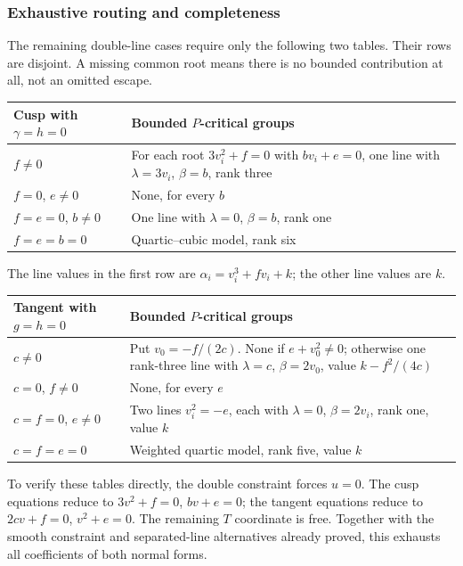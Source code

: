 \documentclass[11pt]{article}
\theoremstyle{definition}\newtheorem{definition}[theorem]{Definition}
\theoremstyle{remark}\newtheorem{remark}[theorem]{Remark}
\begin{document}
\subsubsection*{Exhaustive routing and completeness}

The remaining double-line cases require only the following two
tables. Their rows are disjoint. A missing common root means
there is no bounded contribution at all, not an omitted escape.

\begin{center}\small
\begin{tabular}{@{}p{}p{}@{}}
\toprule
Cusp with $\gamma=h=0$ & Bounded $P$-critical groups\\
\midrule
$f\ne0$ & For each root $3v_i^2+f=0$ with $bv_i+e=0$,
one line with $\lambda=3v_i$, $\beta=b$, rank three\\
$f=0$, $e\ne0$ & None, for every $b$\\
$f=e=0$, $b\ne0$ & One line with $\lambda=0$, $\beta=b$, rank one\\
$f=e=b=0$ & Quartic--cubic model, rank six\\
\bottomrule
\end{tabular}
\end{center}
The line values in the first row are
$\alpha_i=v_i^3+fv_i+k$; the other line values are $k$.

\begin{center}\small
\begin{tabular}{@{}p{}p{}@{}}
\toprule
Tangent with $g=h=0$ & Bounded $P$-critical groups\\
\midrule
$c\ne0$ & Put $v_0=-f/(2c)$. None if $e+v_0^2\ne0$;
otherwise one rank-three line with $\lambda=c$, $\beta=2v_0$,
value $k-f^2/(4c)$\\
$c=0$, $f\ne0$ & None, for every $e$\\
$c=f=0$, $e\ne0$ & Two lines $v_i^2=-e$, each with
$\lambda=0$, $\beta=2v_i$, rank one, value $k$\\
$c=f=e=0$ & Weighted quartic model, rank five, value $k$\\
\bottomrule
\end{tabular}
\end{center}

To verify these tables directly, the double constraint forces
$u=0$. The cusp equations reduce to $3v^2+f=0$, $bv+e=0$;
the tangent equations reduce to $2cv+f=0$, $v^2+e=0$.
The remaining $T$ coordinate is free. Together with the smooth
constraint and separated-line alternatives already proved,
this exhausts all coefficients of both normal forms.
\end{document}
